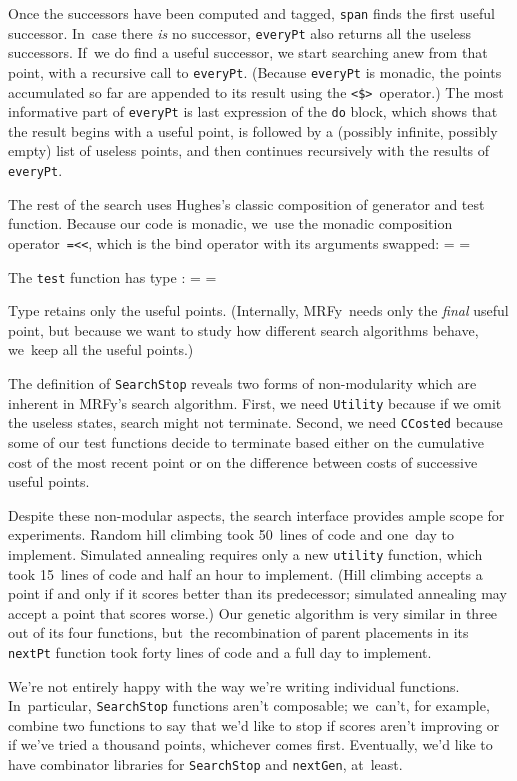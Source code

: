 \documentclass[preprint,nonatbib,blockstyle,times]{sigplanconf}
\newcommand\mrfy{MRFy} %
\newif\ifverbatimsmall
\newcommand\smallverbatiminput[1]{%
  \verbatimsmalltrue
  \presvtopsep=\topsep
  \topsep=0.78\topsep
  \verbatimsmallfalse
  \topsep=\presvtopsep
}
\begin{document}
Once the successors have been computed and tagged,
\texttt{span} finds the first useful successor.
In~case there \emph{is} no successor, \texttt{everyPt} also returns
all the useless successors.
If~we do find a useful successor, we start searching anew from that
point, with a recursive call to \texttt{everyPt}.
(Because \texttt{everyPt} is monadic, the points accumulated so far are
appended to its result using the \verb+<$>+~operator.)
%
The most informative part of \texttt{everyPt} is last expression of
the \texttt{do} block,
which shows that the result begins with a useful point,
is followed by a (possibly infinite, possibly empty) list of useless
points, and then continues recursively with the results of \texttt{everyPt}.

The rest of the search uses Hughes's
classic composition of generator  and test function.
Because our code is monadic, we~use the monadic composition
operator~\texttt{=<<}, which is the bind operator with its arguments
swapped: 
\smallverbatiminput{search}
The \texttt{test} function has type :
\smallverbatiminput{stop}
Type  retains only the useful points.
(Internally, \mrfy\ needs only the \emph{final} useful point,
but because we want to study how different search algorithms behave,
we~keep all the useful points.)

The definition of \texttt{SearchStop} reveals two forms of
non-modularity which are inherent in \mrfy's search algorithm.
First, we need \texttt{Utility} because if we omit the useless states,
search might not terminate.
Second, we need \texttt{CCosted} because some of our test functions
decide to terminate based either on the cumulative cost of the most
recent point or on the difference between costs of successive useful points.

Despite these non-modular aspects, the search
interface provides ample scope for
experiments.
Random hill climbing took 50~lines of code and one~day to
implement.  
Simulated annealing requires only a new
\texttt{utility} function, which took 15~lines of code and half an hour to implement.
(Hill climbing accepts a point if and only if it scores better than its
predecessor;
simulated annealing may accept a point that scores worse.)
Our genetic algorithm is very similar in three out of its four
functions,
but~the recombination of parent
placements in its \texttt{nextPt} function took forty lines of code
and a full day to implement.

We're not entirely happy with the way we're writing individual
functions.
In~particular, \texttt{SearchStop} functions aren't composable;
we~can't, for example, combine two functions to say that we'd like to
stop if scores aren't improving or if we've tried a thousand points,
whichever comes first.
Eventually, we'd like to have
combinator libraries for \texttt{SearchStop} and \texttt{nextGen}, at~least.
\end{document}
